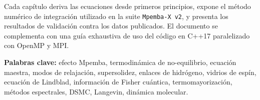 \documentclass[11pt,a4paper,twoside]{report}
\theoremstyle{definition}
\theoremstyle{remark}
\begin{document}
Cada capítulo deriva las ecuaciones desde primeros principios, expone el método 
numérico de integración utilizado en la suite \texttt{Mpemba-X v2}, y presenta los 
resultados de validación contra los datos publicados. El documento se complementa con 
una guía exhaustiva de uso del código en C++17 paralelizado con OpenMP y MPI.

\vspace{1cm}
\noindent\textbf{Palabras clave:} efecto Mpemba, termodinámica de no-equilibrio, ecuación maestra, 
modos de relajación, supersolidez, enlaces de hidrógeno, vidrios de espín, ecuación de 
Lindblad, información de Fisher cuántica, termomayorización, métodos espectrales, DSMC, 
Langevin, dinámica molecular.

\cleardoublepage

\pagestyle{fancy}
\tableofcontents
\cleardoublepage

\mainmatter















\appendix



\backmatter

\end{document}
